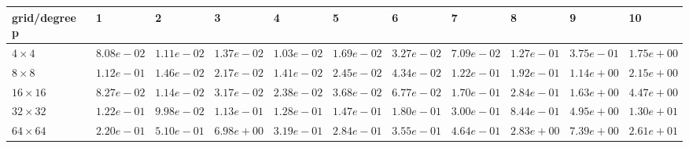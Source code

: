 \begin{tabular}{lllllllllll}
\hline
 grid/degree p   & 1          & 2          & 3          & 4          & 5          & 6          & 7          & 8          & 9          & 10         \\
\hline
 $4 \times 4$    & $8.08e-02$ & $1.11e-02$ & $1.37e-02$ & $1.03e-02$ & $1.69e-02$ & $3.27e-02$ & $7.09e-02$ & $1.27e-01$ & $3.75e-01$ & $1.75e+00$ \\
 $8 \times 8$    & $1.12e-01$ & $1.46e-02$ & $2.17e-02$ & $1.41e-02$ & $2.45e-02$ & $4.34e-02$ & $1.22e-01$ & $1.92e-01$ & $1.14e+00$ & $2.15e+00$ \\
 $16 \times 16$  & $8.27e-02$ & $1.14e-02$ & $3.17e-02$ & $2.38e-02$ & $3.68e-02$ & $6.77e-02$ & $1.70e-01$ & $2.84e-01$ & $1.63e+00$ & $4.47e+00$ \\
 $32 \times 32$  & $1.22e-01$ & $9.98e-02$ & $1.13e-01$ & $1.28e-01$ & $1.47e-01$ & $1.80e-01$ & $3.00e-01$ & $8.44e-01$ & $4.95e+00$ & $1.30e+01$ \\
 $64 \times 64$  & $2.20e-01$ & $5.10e-01$ & $6.98e+00$ & $3.19e-01$ & $2.84e-01$ & $3.55e-01$ & $4.64e-01$ & $2.83e+00$ & $7.39e+00$ & $2.61e+01$ \\
\hline
\end{tabular}